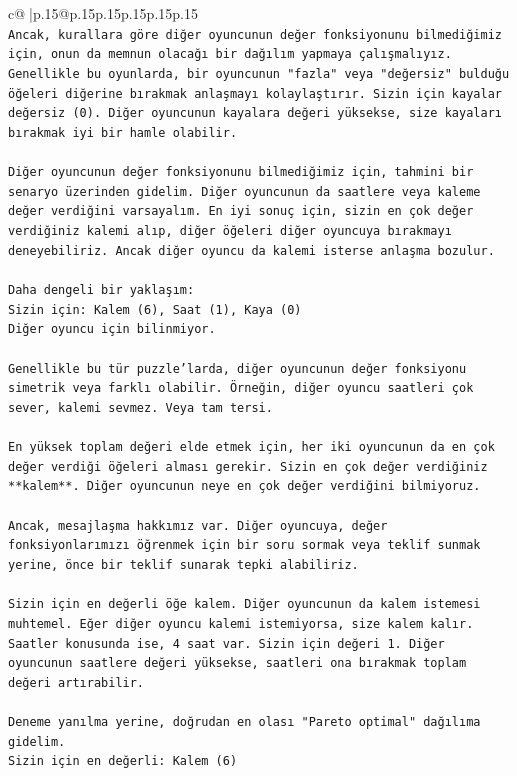 \documentclass{article}
\begin{document}
{\begin{supertabular}{c@{$\;$}|p{.15\linewidth}@{}p{.15\linewidth}p{.15\linewidth}p{.15\linewidth}p{.15\linewidth}p{.15\linewidth}}
{{{\\ 
\texttt{Ancak, kurallara göre diğer oyuncunun değer fonksiyonunu bilmediğimiz için, onun da memnun olacağı bir dağılım yapmaya çalışmalıyız. Genellikle bu oyunlarda, bir oyuncunun "fazla" veya "değersiz" bulduğu öğeleri diğerine bırakmak anlaşmayı kolaylaştırır. Sizin için kayalar değersiz (0). Diğer oyuncunun kayalara değeri yüksekse, size kayaları bırakmak iyi bir hamle olabilir.} \\
\\ 
\texttt{Diğer oyuncunun değer fonksiyonunu bilmediğimiz için, tahmini bir senaryo üzerinden gidelim. Diğer oyuncunun da saatlere veya kaleme değer verdiğini varsayalım. En iyi sonuç için, sizin en çok değer verdiğiniz kalemi alıp, diğer öğeleri diğer oyuncuya bırakmayı deneyebiliriz. Ancak diğer oyuncu da kalemi isterse anlaşma bozulur.} \\
\\ 
\texttt{Daha dengeli bir yaklaşım:} \\
\texttt{Sizin için: Kalem (6), Saat (1), Kaya (0)} \\
\texttt{Diğer oyuncu için bilinmiyor.} \\
\\ 
\texttt{Genellikle bu tür puzzle'larda, diğer oyuncunun değer fonksiyonu simetrik veya farklı olabilir. Örneğin, diğer oyuncu saatleri çok sever, kalemi sevmez. Veya tam tersi.} \\
\\ 
\texttt{En yüksek toplam değeri elde etmek için, her iki oyuncunun da en çok değer verdiği öğeleri alması gerekir. Sizin en çok değer verdiğiniz **kalem**. Diğer oyuncunun neye en çok değer verdiğini bilmiyoruz.} \\
\\ 
\texttt{Ancak, mesajlaşma hakkımız var. Diğer oyuncuya, değer fonksiyonlarımızı öğrenmek için bir soru sormak veya teklif sunmak yerine, önce bir teklif sunarak tepki alabiliriz.} \\
\\ 
\texttt{Sizin için en değerli öğe kalem. Diğer oyuncunun da kalem istemesi muhtemel. Eğer diğer oyuncu kalemi istemiyorsa, size kalem kalır. Saatler konusunda ise, 4 saat var. Sizin için değeri 1. Diğer oyuncunun saatlere değeri yüksekse, saatleri ona bırakmak toplam değeri artırabilir.} \\
\\ 
\texttt{Deneme yanılma yerine, doğrudan en olası "Pareto optimal" dağılıma gidelim.} \\
\texttt{Sizin için en değerli: Kalem (6)} \\
}}}
\end{supertabular}}
\end{document}
